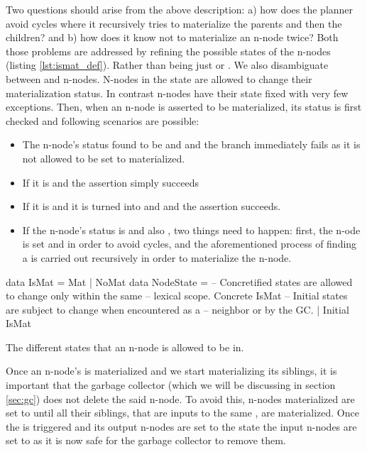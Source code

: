 Two questions should arise from the above description: a) how does the
planner avoid cycles where it recursively tries to materialize the
parents and then the children? and b) how does it know not to
materialize an n-node twice? Both those problems are addressed by
refining the possible states of the n-nodes (listing
\ref{lst:ismat_def}). Rather than being just  or
. We also disambiguate between  and
 n-nodes. N-nodes in the  state are allowed
to change their materialization status. In contrast 
n-nodes have their state fixed with very few exceptions. Then, when an
n-node is asserted to be materialized, its status is first checked and
following scenarios are possible:

\begin{itemize}
\item The n-node's status found to be  and 
  and the branch immediately fails as it is not allowed to be set to
  materialized.
\item If it is  and  the assertion simply
  succeeds
\item If it is  and  it is turned into
   and  and the assertion succeeds.
\item If the n-node's status is  and also ,
  two things need to happen: first, the n-ode is set  and
   in order to avoid cycles, and the aforementioned
  process of finding a  is carried out recursively in
  order to materialize the n-node.
\end{itemize}

\begin{code}
\begin{haskellcode}
data IsMat = Mat | NoMat
data NodeState =
  -- Concretified states are allowed to change only within the same
  -- lexical scope.
  Concrete IsMat
  -- Initial states are subject to change when encountered as a
  -- neighbor or by the GC.
  | Initial IsMat
\end{haskellcode}
  \caption{\label{lst:ismat_def}The different states that an n-node is
    allowed to be in.}
\end{code}

Once an n-node's is materialized and we start materializing its
siblings, it is important that the garbage collector (which we will be
discussing in section \ref{sec:gc}) does not delete the said n-node. To
avoid this, n-nodes materialized are set to 
until all their siblings, that are inputs to the same ,
are materialized. Once the  is triggered and its output
n-nodes are set to the  state the input n-nodes are set
to  as it is now safe for the garbage collector to
remove them.

